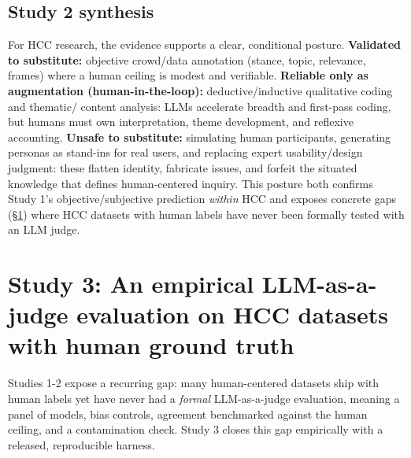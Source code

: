 \subsection{Study 2 synthesis}
For HCC research, the evidence supports a clear, conditional posture.
\textbf{Validated to substitute:} objective crowd/data annotation (stance, topic, relevance, frames) where a human
ceiling is modest and verifiable.
\textbf{Reliable only as augmentation (human-in-the-loop):} deductive/inductive qualitative coding and thematic/
content analysis: LLMs accelerate breadth and first-pass coding, but humans must own interpretation, theme
development, and reflexive accounting.
\textbf{Unsafe to substitute:} simulating human participants, generating personas as stand-ins for real users, and
replacing expert usability/design judgment: these flatten identity, fabricate issues, and forfeit the situated
knowledge that defines human-centered inquiry. This posture both confirms Study 1's objective/subjective prediction
\emph{within} HCC and exposes concrete gaps (\S\ref{sec:study3}) where HCC datasets with human labels have never
been formally tested with an LLM judge.

\section{Study 3: An empirical LLM-as-a-judge evaluation on HCC datasets with human ground truth}
\label{sec:study3}
Studies 1-2 expose a recurring gap: many human-centered datasets ship with human labels yet have never had a
\emph{formal} LLM-as-a-judge evaluation, meaning a panel of models, bias controls, agreement benchmarked against the
human ceiling, and a contamination check. Study 3 closes this gap empirically with a released, reproducible harness.

